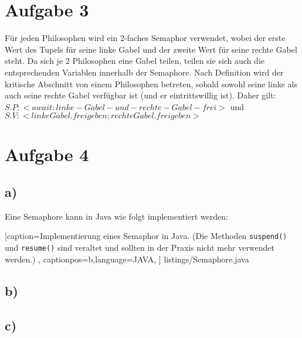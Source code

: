 \documentclass[11pt,a4paper,DIV=10,]{scrartcl}
\begin{document}
\section*{Aufgabe 3}

Für jeden Philosophen wird ein 2-faches Semaphor verwendet, wobei der erste Wert des Tupels für seine linke Gabel und der zweite Wert für seine rechte Gabel steht.  Da sich je 2 Philosophen eine Gabel teilen, teilen sie sich auch die entsprechenden Variablen innerhalb der Semaphore. Nach Definition wird der kritische Abschnitt von einem Philosophen betreten, sobald sowohl seine linke als auch seine rechte Gabel verfügbar ist (und er eintrittswillig ist). Daher gilt: $S.P: < await: linke-Gabel-und-rechte-Gabel-frei> $ und $S.V: <linkeGabel.freigeben; rechteGabel.freigeben >$


\section*{Aufgabe 4}
\subsection*{a)}
Eine Semaphore kann in Java wie folgt implementiert werden:


    [caption={Implementierung eines Semaphor in Java. (Die Methoden \texttt{suspend()} und \texttt{resume()} sind veraltet und sollten in der Praxis nicht mehr verwendet werden.) }
       \label{lst:javaclass},
       captionpos=b,language=JAVA,
       ]
{listings/Semaphore.java}
\subsection*{b)}
\subsection*{c)}



\end{document}
